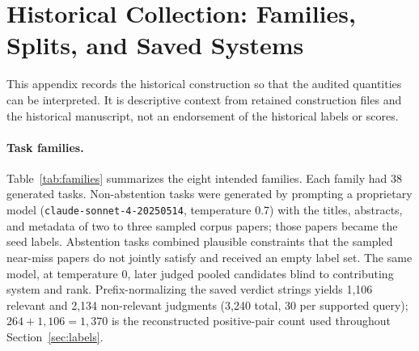 \section{Historical Collection: Families, Splits, and Saved Systems}
\label{app:families}
This appendix records the historical construction so that the audited quantities can be interpreted. It is descriptive context from retained construction files and the historical manuscript, not an endorsement of the historical labels or scores.

\paragraph{Task families.}
Table~\ref{tab:families} summarizes the eight intended families. Each family had 38 generated tasks. Non-abstention tasks were generated by prompting a proprietary model (\texttt{claude-sonnet-4-20250514}, temperature 0.7) with the titles, abstracts, and metadata of two to three sampled corpus papers; those papers became the seed labels. Abstention tasks combined plausible constraints that the sampled near-miss papers do not jointly satisfy and received an empty label set. The same model, at temperature 0, later judged pooled candidates blind to contributing system and rank. Prefix-normalizing the saved verdict strings yields 1,106 relevant and 2,134 non-relevant judgments (3,240 total, 30 per supported query); $264+1{,}106=1{,}370$ is the reconstructed positive-pair count used throughout Section~\ref{sec:labels}.

